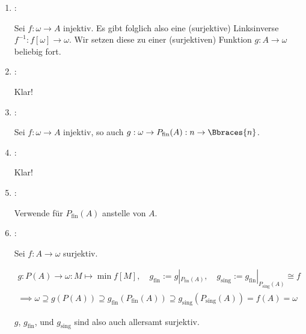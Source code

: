 \begin{solution}
\begin{enumerate}[label = \texttt{ad}]
  \item {}:
  
  Sei $f: \omega \to A$ injektiv.
  Es gibt folglich also eine (surjektive) Linksinverse $f^{-1}: f[\omega] \to \omega$.
  Wir setzen diese zu einer (surjektiven) Funktion $g: A \to \omega$ beliebig fort.

  \item {}:
  
  Klar!

  \item {}:

  Sei $f: \omega \to A$ injektiv, so auch $g: \omega \to P_\mathrm{fin}(A): n \to \Bbraces{n}$.

  \item {}:

  Klar!

  \item {}:

  Verwende  für $P_\mathrm{fin}(A)$ anstelle von $A$.

  \item {}:

  Sei $f: A \to \omega$ surjektiv.

  \begin{gather*}
    g:
    P(A) \to \omega:
    M \mapsto \min f[M],
    \quad
    g_\mathrm{fin} := g |_{P_\mathrm{fin}(A)},
    \quad
    g_\mathrm{sing} := g_\mathrm{fin} |_{P_\mathrm{sing}(A)} \cong f \\
    \implies
    \omega
    \supseteq
    g(P(A))
    \supseteq
    g_\mathrm{fin}(P_\mathrm{fin}(A))
    \supseteq
    g_\mathrm{sing}(P_\mathrm{sing}(A))
    =
    f(A)
    =
    \omega
  \end{gather*}

  $g$, $g_\mathrm{fin}$, und $g_\mathrm{sing}$ sind also auch allersamt surjektiv.

\end{enumerate}

\end{solution}

